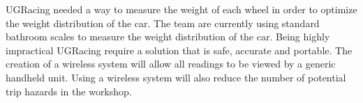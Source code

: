 UGRacing needed a way to measure the weight of each wheel in order to optimize the weight distribution of the car. The team are currently using standard bathroom scales to measure the weight distribution of the car. Being highly impractical UGRacing require a solution that is safe, accurate and portable. The creation of a wireless system will allow all readings to be viewed by a generic handheld unit. Using a wireless system will also reduce the number of potential trip hazards in the workshop.


